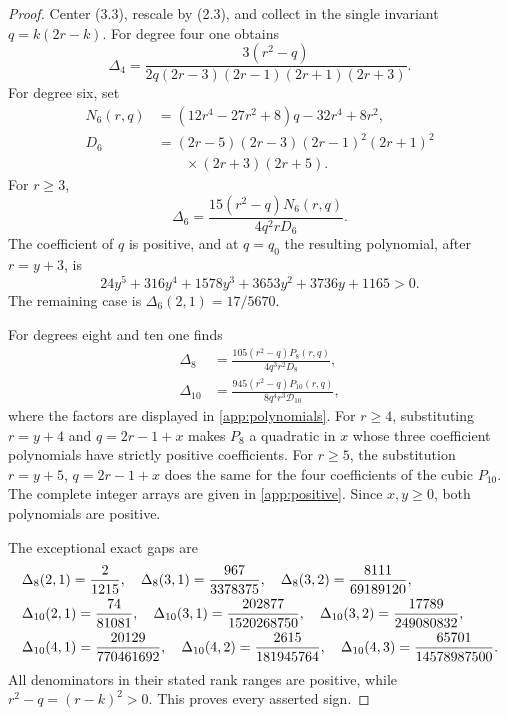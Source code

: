 \documentclass[11pt]{article}
\newcommand{\cD}{\mathcal D}
\begin{document}
\begin{proof}
Center (3.3), rescale by (2.3), and collect in the single invariant
$q=k(2r-k)$.  For degree four one obtains
\begin{equation}
 \Delta_4=
 \frac{3(r^2-q)}
 {2q(2r-3)(2r-1)(2r+1)(2r+3)}.                             \tag{3.6}
\end{equation}
For degree six, set
\begin{equation}
\begin{aligned}
 N_6(r,q)&=(12r^4-27r^2+8)q-32r^4+8r^2,\\
 D_6&=(2r-5)(2r-3)(2r-1)^2(2r+1)^2\\
    &\qquad\times(2r+3)(2r+5).
\end{aligned}                                                       \tag{3.7}
\end{equation}
For $r\ge3$,
\begin{equation}
 \Delta_6=\frac{15(r^2-q)N_6(r,q)}{4q^2rD_6}.              \tag{3.8}
\end{equation}
The coefficient of $q$ is positive, and at $q=q_0$ the resulting polynomial,
after $r=y+3$, is
\begin{equation}
24y^5+316y^4+1578y^3+3653y^2+3736y+1165>0.                 \tag{3.9}
\end{equation}
The remaining case is $\Delta_6(2,1)=17/5670$.

For degrees eight and ten one finds
\begin{align}
 \Delta_8&=\frac{105(r^2-q)P_8(r,q)}{4q^3r^2D_8},          \tag{3.10}\\
 \Delta_{10}&=\frac{945(r^2-q)P_{10}(r,q)}
 {8q^4r^3\cD_{10}},                                       \tag{3.11}
\end{align}
where the factors are displayed in \cref{app:polynomials}.  For $r\ge4$,
substituting $r=y+4$ and $q=2r-1+x$ makes $P_8$ a quadratic in $x$ whose
three coefficient polynomials have strictly positive coefficients.  For
$r\ge5$, the substitution $r=y+5$, $q=2r-1+x$ does the same for the four
coefficients of the cubic $P_{10}$.  The complete integer arrays are given in
\cref{app:positive}.  Since $x,y\ge0$, both polynomials are positive.

The exceptional exact gaps are
\begin{align*}
&\Delta_8(2,1)=\frac2{1215},\quad
 \Delta_8(3,1)=\frac{967}{3378375},\quad
 \Delta_8(3,2)=\frac{8111}{69189120},\notag\\
&\Delta_{10}(2,1)=\frac{74}{81081},\quad
 \Delta_{10}(3,1)=\frac{202877}{1520268750},\quad
 \Delta_{10}(3,2)=\frac{17789}{249080832},\notag\\
&\Delta_{10}(4,1)=\frac{20129}{770461692},\quad
 \Delta_{10}(4,2)=\frac{2615}{181945764},\quad
 \Delta_{10}(4,3)=\frac{65701}{14578987500}.
\end{align*}
All denominators in their stated rank ranges are positive, while
$r^2-q=(r-k)^2>0$.  This proves every asserted sign.
\end{proof}
\end{document}
